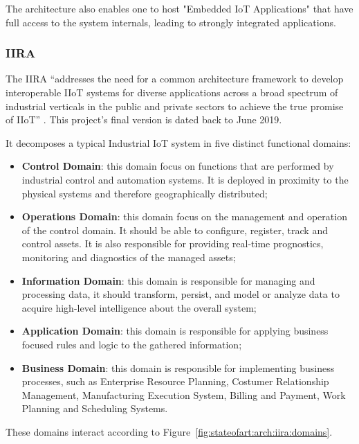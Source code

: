 The architecture also enables one to host "Embedded IoT Applications" that have full access to the system internals, leading to strongly integrated applications.

\subsubsection{IIRA}
\label{subsubsec:stateofart:arch:iira}

The \gls{IIRA} ``addresses the need for a common architecture framework to develop interoperable IIoT systems for diverse applications across a broad spectrum of industrial verticals in the public and private sectors to achieve the true promise of IIoT'' \parencite{iira}. This project's final version is dated back to June 2019.

It decomposes a typical Industrial \gls{IoT} system in five distinct functional domains:

\begin{itemize}
    \item \textbf{Control Domain}: this domain focus on functions that are performed by industrial control and automation systems. It is deployed in proximity to the physical systems and therefore geographically distributed;
    \item \textbf{Operations Domain}: this domain focus on the management and operation of the control domain. It should be able to configure, register, track and control assets. It is also responsible for providing real-time prognostics, monitoring and diagnostics of the managed assets;
    \item \textbf{Information Domain}: this domain is responsible for managing and processing data, it should transform, persist, and model or analyze data to acquire high-level intelligence about the overall system;
    \item \textbf{Application Domain}: this domain is responsible for applying business focused rules and logic to the gathered information;
    \item \textbf{Business Domain}: this domain is responsible for implementing business processes, such as Enterprise Resource Planning, Costumer Relationship Management, Manufacturing Execution System, Billing and Payment, Work Planning and Scheduling Systems. 
\end{itemize}

These domains interact according to Figure~\ref{fig:stateofart:arch:iira:domains}.

